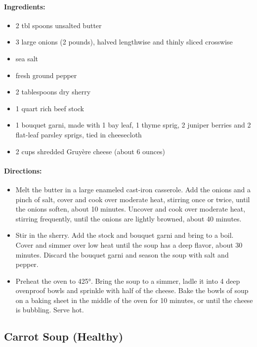 \documentclass{article}
\begin{document}
\paragraph{Ingredients:}
\begin{itemize}
    \item 2 tbl spoons unsalted butter
    \item 3 large onions (2 pounds), halved lengthwise and thinly sliced crosswise
    \item sea salt
    \item fresh ground pepper
    \item 2 tablespoons dry sherry
    \item 1 quart rich beef stock
    \item 1 bouquet garni, made with 1 bay leaf, 1 thyme sprig, 2 juniper berries and 2 flat-leaf parsley sprigs, tied in cheesecloth
    \item 2 cups shredded Gruyère cheese (about 6 ounces)
\end{itemize}

\paragraph{Directions:}
\begin{itemize}
    \item Melt the butter in a large enameled cast-iron casserole. Add the onions and a pinch of salt, cover and cook over moderate heat, stirring once or twice, until the onions soften, about 10 minutes. Uncover and cook over moderate heat, stirring frequently, until the onions are lightly browned, about 40 minutes.
    \item Stir in the sherry. Add the stock and bouquet garni and bring to a boil. Cover and simmer over low heat until the soup has a deep flavor, about 30 minutes. Discard the bouquet garni and season the soup with salt and pepper.
    \item Preheat the oven to 425°. Bring the soup to a simmer, ladle it into 4 deep ovenproof bowls and sprinkle with half of the cheese. Bake the bowls of soup on a baking sheet in the middle of the oven for 10 minutes, or until the cheese is bubbling. Serve hot.
\end{itemize}

\subsection{Carrot Soup (Healthy)}
\end{document}
